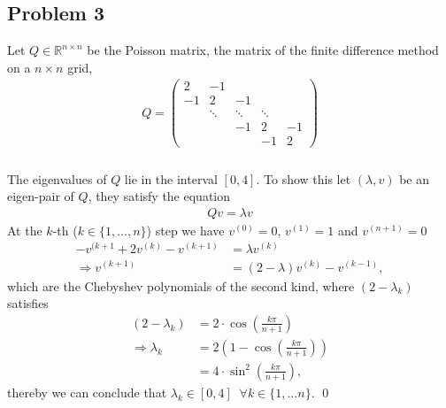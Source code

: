 \subsection{Problem 3}
Let $Q \in \mathbb{R}^{n \times n}$ be the Poisson matrix, the matrix of
the finite difference method on a $n \times n$ grid,
\begin{align}
    Q =
    \begin{pmatrix}
        2 & -1 &   &  &   \\
        -1& 2  & -1&  &   \\
          & \ddots  & \ddots & \ddots &   \\
          &   & -1 &  2 & -1\\
          &   &  &  -1 & 2
    \end{pmatrix}
\end{align}
\subsubsection{}
The eigenvalues of $Q$ lie in the interval $[0 ,4]$. To show this let
$(\lambda , v)$ be an eigen-pair of $Q$, they satisfy the equation
\begin{align}
    Qv = \lambda v
\end{align}
At the $k$-th ($k \in \{1,\ldots,n\}$) step we have $v^{(0)} = 0$, $v^{(1)} =
1$ and $v^{(n+1)} = 0$
\begin{align}
    -v^{(k+1} + 2v^{(k)} - v^{(k+1)} &= \lambda v^{(k)}\\
    \Rightarrow v^{(k+1)} &= (2-\lambda) v^{(k)} - v^{(k-1)},
\end{align}
which are the Chebyshev polynomials of the second kind, where $(2-\lambda_k)$
satisfies
\begin{align}
    (2-\lambda_k) &= 2\cdot \cos\left(\frac{k\pi}{n+1}\right)\\
    \Rightarrow \lambda_k &= 2\left( 1 - \cos\left( \frac{k\pi}{n+1} \right)
    \right) \\
          &=4\cdot\sin^2\left( \frac{k\pi}{n+1} \right),
\end{align}
thereby we can conclude that $\lambda_k \in [0, 4] \;\; \forall k \in \{1,
\dots n\}$. \qed
\subsubsection{}
